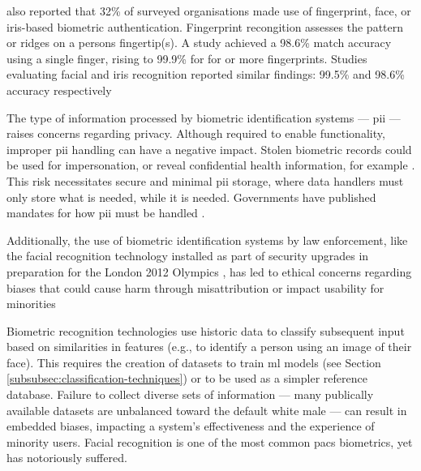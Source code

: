 \cite{ifsecglobalStatePhysicalAccess2024} also reported that 32\% of surveyed organisations made use of fingerprint, face, or iris-based biometric authentication.
Fingerprint recongition assesses the pattern or ridges on a persons fingertip(s).
A \cite{nationalinstituteofstandardsandtechnologyNISTStudyShows2004} study achieved a 98.6\% match accuracy using a single finger, rising to 99.9\% for for or more fingerprints.
Studies evaluating facial and iris recognition reported similar findings: 99.5\% and 98.6\% accuracy respectively \parencite{nationalinstituteofstandardsandtechnologyNISTEvaluatesFace2021,universityofbaghdadHighaccuracyModelsIris2024}

The type of information processed by biometric identification systems --- \ac{pii} --- raises concerns regarding privacy.
Although required to enable functionality, improper \ac{pii} handling can have a negative impact.
Stolen biometric records could be used for impersonation, or reveal confidential health information, for example \parencite{parliamentaryofficeofscienceandtechnologyBiometricDataMisuse2024}.
This risk necessitates secure and minimal \ac{pii} storage, where data handlers must only store what is needed, while it is needed.
Governments have published mandates for how \ac{pii} must be handled \parencite{informationcommissionersofficeBiometricDataGuidance2024}.

Additionally, the use of biometric identification systems by law enforcement, like the facial recognition technology installed as part of security upgrades in preparation for the London 2012 Olympics \parencite{homeofficeLondon2012Safe2011}, has led to ethical concerns regarding biases that could cause harm through misattribution or impact usability for minorities \parencite{uwazuruikePoliceUseLive2025,leslieUnderstandingBiasFacial2020}

Biometric recognition technologies use historic data to classify subsequent input based on similarities in features (e.g., to identify a person using an image of their face).
This requires the creation of datasets to train \ac{ml} models (see Section \ref{subsubsec:classification-techniques}) or to be used as a simpler reference database.
Failure to collect diverse sets of information --- many publically available datasets are unbalanced toward the default white male --- can result in embedded biases, impacting a system's effectiveness and the experience of minority users.
Facial recognition is one of the most common \ac{pacs} biometrics, yet has notoriously suffered.

